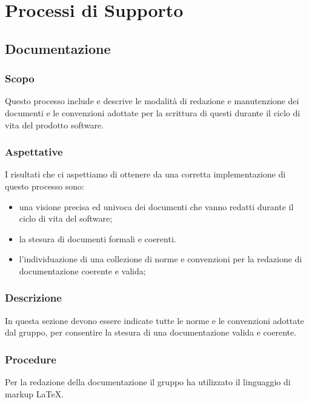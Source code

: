 \section{Processi di Supporto}


\subsection{Documentazione}
	
	\subsubsection{Scopo}
	Questo processo include e descrive le modalità di redazione e manutenzione dei documenti e le convenzioni 
	adottate per la scrittura di questi durante il ciclo di vita del prodotto software.
	
	\subsubsection{Aspettative}
	I risultati che ci aspettiamo di ottenere da una corretta implementazione di questo processo sono:
	\begin{itemize}  
		\item una visione precisa ed univoca dei documenti che vanno redatti durante il ciclo di vita del software;
		\item la stesura di documenti formali e coerenti.
		\item l’individuazione di una collezione di norme e convenzioni per la redazione di documentazione coerente e valida;
	\end{itemize}

	\subsubsection{Descrizione}
	In questa sezione devono essere indicate tutte le norme e le convenzioni adottate dal
	gruppo, per consentire la stesura di una documentazione valida e coerente.
	
	\subsubsection{Procedure}
	Per la redazione della documentazione il gruppo ha utilizzato il linguaggio di markup {\LaTeX}.
	
